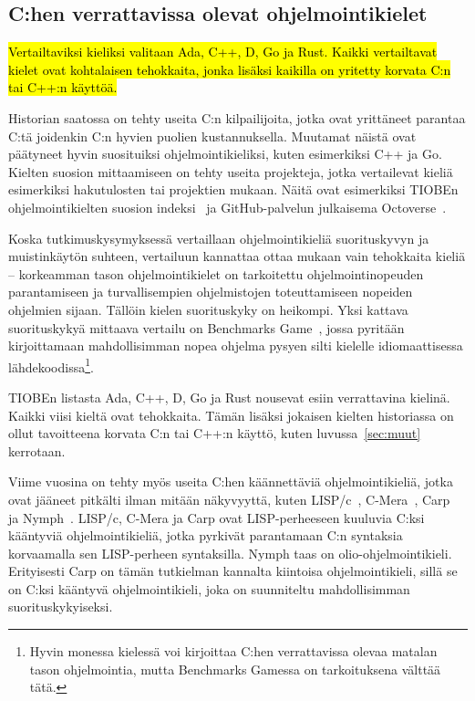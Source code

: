 \subsection{C:hen verrattavissa olevat ohjelmointikielet}

\hl{Vertailtaviksi kieliksi valitaan Ada, C++, D, Go ja Rust. Kaikki
vertailtavat kielet ovat kohtalaisen tehokkaita, jonka lisäksi kaikilla on
yritetty korvata C:n tai C++:n käyttöä.}

Historian saatossa on tehty useita C:n kilpailijoita, jotka ovat yrittäneet
parantaa C:tä joidenkin C:n hyvien puolien kustannuksella. Muutamat näistä ovat
päätyneet hyvin suosituiksi ohjelmointikieliksi, kuten esimerkiksi C++ ja Go.
Kielten suosion mittaamiseen on tehty useita projekteja, jotka vertailevat
kieliä esimerkiksi hakutulosten tai projektien mukaan. Näitä ovat esimerkiksi
TIOBEn ohjelmointikielten suosion indeksi~\citep{tiobe} ja GitHub-palvelun
julkaisema \mbox{Octoverse}~\citep{octoverse}.

Koska tutkimuskysymyksessä vertaillaan ohjelmointikieliä suorituskyvyn ja
muistinkäytön suhteen, vertailuun kannattaa ottaa mukaan vain tehokkaita kieliä
-- korkeamman tason ohjelmointikielet on tarkoitettu ohjelmointinopeuden
parantamiseen ja turvallisempien ohjelmistojen toteuttamiseen nopeiden
ohjelmien sijaan. Tällöin kielen suorituskyky on heikompi. Yksi kattava
suorituskykyä mittaava vertailu on Benchmarks Game~\citep{benchmarks}, jossa
pyritään kirjoittamaan mahdollisimman nopea ohjelma pysyen silti kielelle
idiomaattisessa lähdekoodissa\footnote{Hyvin monessa kielessä voi kirjoittaa
C:hen verrattavissa olevaa matalan tason ohjelmointia, mutta Benchmarks Gamessa
on tarkoituksena välttää tätä.}.

TIOBEn listasta Ada, C++, D, Go ja Rust nousevat esiin verrattavina kielinä.
Kaikki viisi kieltä ovat tehokkaita. Tämän lisäksi jokaisen kielten historiassa
on ollut tavoitteena korvata C:n tai C++:n käyttö, kuten luvussa~\ref{sec:muut}
kerrotaan.

Viime vuosina on tehty myös useita C:hen käännettäviä ohjelmointikieliä, jotka
ovat jääneet pitkälti ilman mitään näkyvyyttä, kuten LISP/c~\citep{clisp1},
C-Mera~\citep{clisp2}, Carp~\citep{clisp3} ja Nymph~\citep{nymph}. LISP/c,
C-Mera ja Carp ovat LISP-perheeseen kuuluvia C:ksi kääntyviä ohjelmointikieliä,
jotka pyrkivät parantamaan C:n syntaksia korvaamalla sen LISP-perheen
syntaksilla. Nymph taas on olio-ohjelmointikieli. Erityisesti Carp on tämän
tutkielman kannalta kiintoisa ohjelmointikieli, sillä se on C:ksi kääntyvä
ohjelmointikieli, joka on suunniteltu mahdollisimman suorituskykyiseksi.


